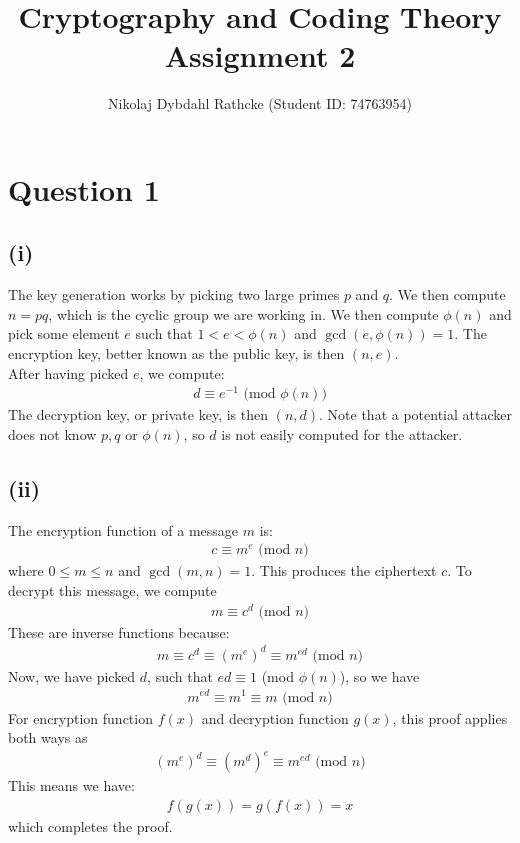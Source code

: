 \documentclass[a4paper, fleqn]{article}
\author{Nikolaj Dybdahl Rathcke (Student ID: 74763954)}
\title{Cryptography and Coding Theory \\ Assignment 2}
\begin{document}


\section{Question 1}
\subsection{(i)}
The key generation works by picking two large primes $p$ and $q$. We then compute $n=pq$, which is the cyclic group we are working in. We then compute $\phi(n)$ and pick some element $e$ such that $1<e<\phi(n)$ and $\gcd(e,\phi(n))=1$. The encryption key, better known as the public key, is then $(n,e)$. \\
After having picked $e$, we compute:
\begin{align}\label{eq1}
  d\equiv e^{-1} \mbox{ (mod $\phi(n)$)}
\end{align}
The decryption key, or private key, is then $(n, d)$. Note that a potential attacker does not know $p,q$ or $\phi(n)$, so $d$ is not easily computed for the attacker.

\subsection{(ii)}
The encryption function of a message $m$ is:
\begin{align*}
  c\equiv m^e \mbox{ (mod $n$)}
\end{align*}
where $0\leq m\leq n$ and $\gcd(m,n)=1$. This produces the ciphertext $c$. To decrypt this message, we compute
\begin{align*}
  m \equiv c^d \mbox{ (mod $n$)}
\end{align*}
These are inverse functions because:
\begin{align*}
  m \equiv c^d \equiv (m^e)^d \equiv m^{ed} \mbox{ (mod $n$)}
\end{align*}
Now, we have picked $d$, such that $ed\equiv 1$ (mod $\phi(n)$), so we have
\begin{align*}
  m^{ed}\equiv m^1\equiv m \mbox{ (mod $n$)}
\end{align*}
For encryption function $f(x)$ and decryption function $g(x)$, this proof applies both ways as \begin{align*}
  (m^e)^d\equiv (m^d)^e\equiv m^{ed} \mbox { (mod $n$)}
\end{align*}
This means we have:
\begin{align*}
  f(g(x))=g(f(x))=x
\end{align*}
which completes the proof.
\end{document}
